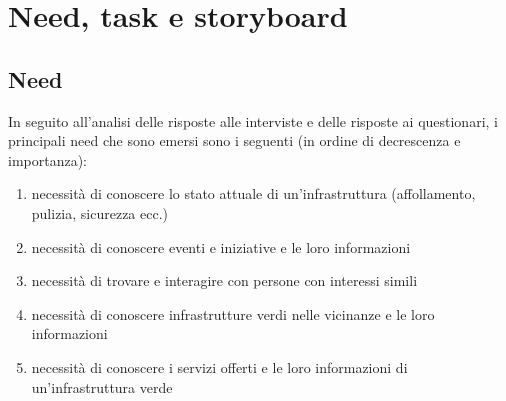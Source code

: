 \chapter{Need, task e storyboard}
\section{Need}
In seguito all’analisi delle risposte alle interviste e delle risposte ai questionari, i principali need che sono emersi sono i seguenti (in ordine di decrescenza e importanza):
\begin{enumerate}
    \item necessità di conoscere lo stato attuale di un’infrastruttura (affollamento, pulizia, sicurezza ecc.)
    \item necessità di conoscere eventi e iniziative e le loro informazioni
    \item necessità di trovare e interagire con persone con interessi simili
    \item necessità di conoscere infrastrutture verdi nelle vicinanze e le loro informazioni
    \item necessità di conoscere i servizi offerti e le loro informazioni di un’infrastruttura verde
\end{enumerate}
